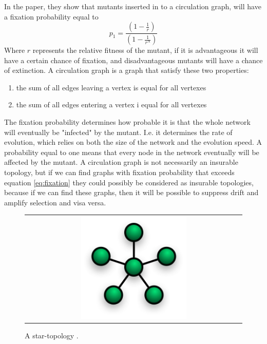 In the \cite{lieberman2005evolutionary} paper, they show that mutants inserted in to a
 circulation graph, will have a fixation probability equal to
\begin{equation}  p_{1}=\frac{(1-\frac{1}{r})}{(1-\frac{1}{r^{N}})} \label{eq:fixation} \end{equation}
Where $r$ represents the relative fitness of the mutant, if it is advantageous it will have a certain chance of fixation, and disadvantageous mutants will have a chance of extinction. 
A circulation graph is a graph that satisfy these two properties:
\begin{enumerate}
\item the sum of all edges leaving a vertex is equal for all vertexes
\item the sum of all edges entering a vertex i equal for all vertexes
\end{enumerate}
The fixation probability determines how probable it is that the whole network will eventually be
"infected" by the mutant. I.e. it determines the rate of evolution, which relies on both the size of the
network and the evolution speed. 
A probability equal to one means that every node in the network eventually will be affected by the mutant.
A circulation graph is not necessarily an insurable topology, but if we can find graphs with  fixation probability that exceeds equation \ref{eq:fixation} they could possibly be considered as insurable topologies, because if we can find these graphs, then it will be possible to suppress drift and amplify selection and visa versa. 
\begin{figure}[b]
\centering
\begin{tabular}{@{}c@{}}
\includegraphics[width=0.5\textwidth]{NetworkTopology-Star.png}
\end{tabular}
\caption{
\label{fig:star} A star-topology 
\cite{lieberman2005evolutionary} . 
}
\end{figure}
